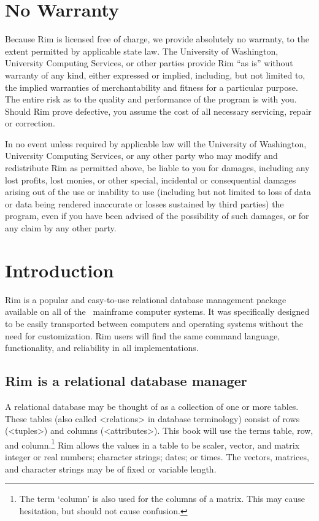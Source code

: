 \chapter*{No Warranty}
%
{\parindent0pt\parskip1pc
  Because Rim is licensed free of charge, we provide absolutely
  no warranty, to the extent permitted by applicable state law.
  The University of Washington, University Computing Services,
  or other parties provide Rim ``as is''
  without warranty of any kind, either expressed or implied, including,
  but not limited to, the implied warranties of merchantability and
  fitness for a particular purpose.  The entire risk as to the quality
  and performance of the program is with you.  Should Rim
  prove defective, you assume the cost of all necessary
  servicing, repair or correction.
 
  In no event unless required by applicable law will
  the University of Washington, University Computing Services,
  or any other party who may
  modify and redistribute Rim as permitted above, be liable to you
  for damages, including any lost profits, lost monies, or other
  special, incidental or consequential damages arising out of the use or
  inability to use (including but not limited to loss of data or data
  being rendered inaccurate or losses sustained by third parties)
  the program, even if you have been
  advised of the possibility of such damages, or for any claim by any
  other party.
}
%
%
\textpages
%
%
\chapter{Introduction}
 
Rim is a popular and easy-to-use
relational database management package available
on all of the \UCS\ mainframe computer systems.
It was specifically designed to be easily transported between
computers and operating systems without the need for
customization.  Rim users will find the same command language,
functionality, and reliability in all implementations.
 
 
\section{Rim is a relational database manager}
A relational database may be thought of as a collection of
one or more tables.  These tables (also called <relations> in
database terminology) consist of rows (<tuples>) and
columns (<attributes>).
This book will use the terms table,
row, and column.\footnote{The term `column' is also used for
the columns of a matrix.  This may cause hesitation, but
should not cause confusion.}
Rim allows the values in a table to be
scaler, vector, and matrix integer or real numbers;
character strings; dates; or times.
The vectors, matrices, and character strings may be of fixed
or variable length.
 
